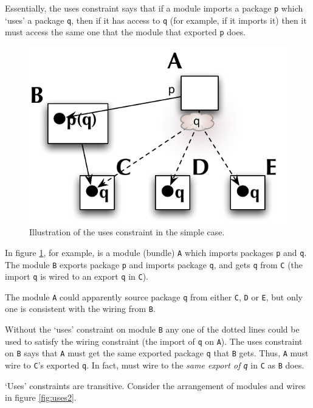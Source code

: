 \documentclass[a4paper,12pt]{article}
\begin{document}
Essentially, the uses constraint says that if a module imports a package {\tt p} which `uses' a package {\tt q}, then if it has access to {\tt q} (for example, if it imports it) then it must access the same one that the module that exported {\tt p} does.

\begin{figure}[h]
\centering
\includegraphics*[scale=0.7]{usesCase1.pdf}
\caption[Simple case]{Illustration of the uses constraint in the simple case.}
\label{fig:uses1}
\end{figure}

In figure \ref{fig:uses1}, for example, is a module (bundle) {\tt A} which imports packages {\tt p} and {\tt q}. The module {\tt B}  exports package {\tt p} and imports package {\tt q}, and gets {\tt q} from {\tt C} (the import {\tt q} is wired to an export {\tt q} in {\tt C}).

The module {\tt A} could apparently source package {\tt q} from either {\tt C}, {\tt D} or {\tt E}, but only one is consistent with the wiring from {\tt B}.

Without the `uses' constraint on module {\tt B} any one of the dotted lines could be used to satisfy the wiring constraint (the import of {\tt q} on {\tt A}). The uses constraint on {\tt B} says that {\tt A} must get the same exported package {\tt q} that {\tt B} gets. Thus, {\tt A} must wire to {\tt C}'s exported {\tt q}. In fact, must wire to the {\it same export of {\tt q}} in {\tt C} as {\tt B} does.

`Uses' constraints are transitive. Consider the arrangement of modules and wires in figure \ref{fig:uses2}.
\end{document}
